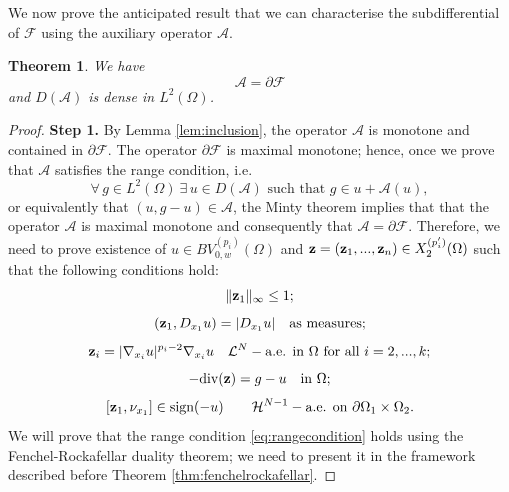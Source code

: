 \documentclass[reqno,12pt]{amsart}
\def\z{{\bf z}}
\newtheorem{theorem}{Theorem}[section]
\numberwithin{equation}{section}
\begin{document}
We now prove the anticipated result that we can characterise the subdifferential of $\mathcal{F}$ using the auxiliary operator $\mathcal{A}$.

\begin{theorem}\label{thm:subdifferentialgradientflow}
We have
$$ \mathcal{A} = \partial \mathcal{F}$$
and $D(\mathcal{A})$ is dense in $L^2(\Omega)$.
\end{theorem}

\begin{proof} 
{\bf Step 1.} By Lemma \ref{lem:inclusion}, the operator $\mathcal{A}$ is monotone and contained in $\partial \mathcal{F}$. The operator $\partial \mathcal{F}$ is maximal monotone; hence, once we prove that $\mathcal{A}$ satisfies the range condition, i.e.
\begin{equation}\label{eq:rangecondition}
\forall \, g \in  L^2(\Omega) \ \exists \, u \in D(\mathcal{A}) \,\, \mbox{such that} \,\,  g \in u + \mathcal{A}(u),
\end{equation}
or equivalently that $(u, g-u) \in \mathcal{A}$, the Minty theorem implies that that the operator $\mathcal{A}$ is maximal monotone and consequently that $\mathcal{A} = \partial \mathcal{F}$. Therefore, we need to prove existence of $u \in BV_{0,w}^{(p_i)}(\Omega)$ and $\z = (\z_1, ..., \z_n) \in X^{(p'_i)}_2(\Omega)$ such that the following conditions hold:
\begin{equation}\label{eq:linftybound}
\| \z_1 \|_\infty \leq 1;
\end{equation}
\begin{equation}\label{eq:firstcoordinate}
(\z_1, D_{x_1} u) = |D_{x_1} u| \quad \hbox{as measures};
\end{equation}
\begin{equation}\label{eq:othercoordinates}
\z_i = |\nabla_{x_i} u|^{p_i - 2} \nabla_{x_i} u \quad \mathcal{L}^N-\hbox{a.e. in } \Omega \hbox{ for all } i = 2,...,k;
\end{equation}
\begin{equation}\label{eq:divergenceconstraint}
-\mathrm{div}(\z) = g-u \quad \hbox{in} \ \Omega;
\end{equation}
\begin{equation}\label{eq:boundarycondition}
[\z_1, \nu_{x_1}] \in \mbox{sign}(-u) \qquad  \mathcal{H}^{N-1}-\mbox{a.e.  on} \ \partial \Omega_1 \times \Omega_2.
\end{equation}
We will prove that the range condition \eqref{eq:rangecondition} holds using the Fenchel-Rockafellar duality theorem; we need to present it in the framework described before Theorem \ref{thm:fenchelrockafellar}. 


\end{proof}
\end{document}
